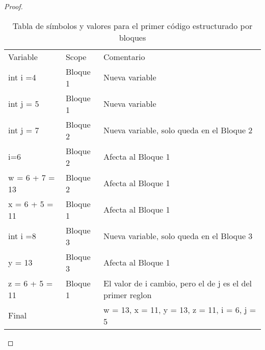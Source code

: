 \begin{proof}
    \hspace{5mm}

\begin{table}[h!]
\centering
\begin{tabular}{lll}
Variable                    & Scope    & Comentario                                                 \\
int i =4                    & Bloque 1 & Nueva variable                                             \\
int j = 5                   & Bloque 1 & Nueva variable                                             \\
int j = 7                   & Bloque 2 & Nueva variable, solo queda en el Bloque 2                  \\ 
i=6                         & Bloque 2 & Afecta al Bloque 1                                         \\
w = 6 + 7 = 13              & Bloque 2 & Afecta al Bloque 1                                         \\
x = 6 + 5 = 11              & Bloque 1 & Afecta al Bloque 1                                         \\
int i =8                    & Bloque 3 & Nueva variable, solo queda en el Bloque 3                  \\
y = 13                      & Bloque 3 & Afecta al Bloque 1                                         \\
z = 6 + 5 = 11              & Bloque 1 & El valor de i cambio, pero el de j es el del primer reglon \\
Final                       &          & w = 13, x = 11, y = 13, z = 11, i = 6, j = 5                         
\end{tabular}
\caption{Tabla de símbolos y valores para el primer código estructurado por bloques}
\end{table}


\end{proof}
